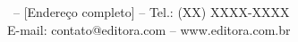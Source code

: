 \begin{center}
\begin{minipage}{0.9\textwidth}
		\vspace*{1cm}
		
		\begin{center}
			\footnotesize %
			\publisher\ -- [Endereço completo] -- Tel.: (XX) XXXX-XXXX \\
			E-mail: contato@editora.com -- www.editora.com.br
		\end{center}
	\end{minipage}
\end{center}

\vfill